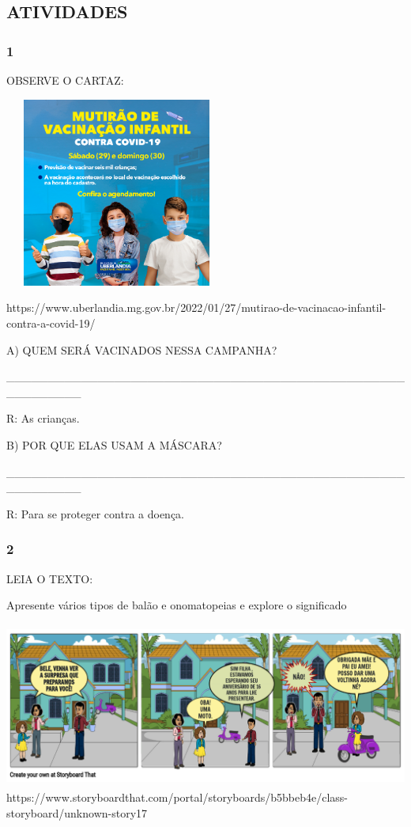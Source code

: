 \subsection{ATIVIDADES}\label{atividades-6}

\subsubsection{1 }\label{section-81}

OBSERVE O CARTAZ:

\includegraphics[width=2.89864in,height=2.45070in]{media/image128.png}

https://www.uberlandia.mg.gov.br/2022/01/27/mutirao-de-vacinacao-infantil-contra-a-covid-19/

A) QUEM SERÁ VACINADOS NESSA CAMPANHA?

\_\_\_\_\_\_\_\_\_\_\_\_\_\_\_\_\_\_\_\_\_\_\_\_\_\_\_\_\_\_\_\_\_\_\_\_\_\_\_\_\_\_\_\_\_\_\_\_\_\_\_\_\_\_\_\_\_

R: As crianças.

B) POR QUE ELAS USAM A MÁSCARA?

\_\_\_\_\_\_\_\_\_\_\_\_\_\_\_\_\_\_\_\_\_\_\_\_\_\_\_\_\_\_\_\_\_\_\_\_\_\_\_\_\_\_\_\_\_\_\_\_\_\_\_\_\_\_\_\_\_

R: Para se proteger contra a doença.

\subsubsection{2 }\label{section-82}

LEIA O TEXTO:

Apresente vários tipos de balão e onomatopeias e explore o significado

\includegraphics[width=5.56806in,height=2.13216in]{media/image129.png}https://www.storyboardthat.com/portal/storyboards/b5bbeb4e/class-storyboard/unknown-story17


